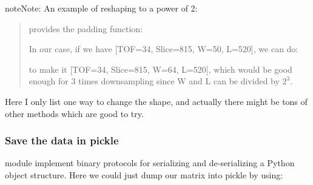 \documentclass[letterpaper,10pt,english]{sphinxmanual}
\begin{document}
\begin{sphinxadmonition}{note}{Note:}
An example of reshaping to a power of 2:
\begin{quote}

 provides the padding function:

%
\begin{sphinxVerbatim}[commandchars=\\\{\}]
           
\end{sphinxVerbatim}

In our case, if we have {[}TOF=34, Slice=815, W=50, L=520{]}, we can do:

%
\begin{sphinxVerbatim}[commandchars=\\\{\}]
           
\end{sphinxVerbatim}

to make it {[}TOF=34, Slice=815, W=64, L=520{]}, which would be good enough for 3 times downsampling since W and L can be divided by \(2^3\).
\end{quote}

Here I only list one way to change the shape, and actually there might be tons of other methods which are good to try.
\end{sphinxadmonition}


\subsubsection{Save the data in pickle}
\label{\detokenize{usage/data:save-the-data-in-pickle}}
 module implement binary protocols for serializing and de-serializing a Python object structure. Here we could just dump our matrix into pickle by using:
\end{document}
